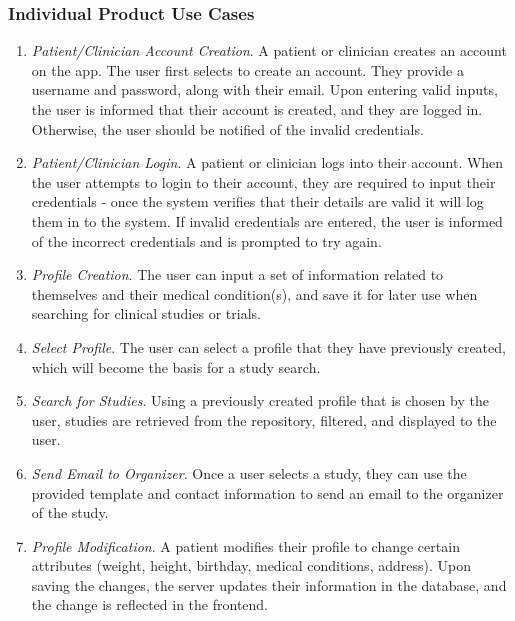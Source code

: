 \documentclass[12pt, titlepage]{article}
\begin{document}
\subsubsection{Individual Product Use Cases}

\begin{enumerate}

\item \textit{Patient/Clinician Account Creation}. A patient or clinician creates an account on the app. The user first selects to create an account. They provide a username and password, along with their email. Upon entering valid inputs, the user is informed that their account is created, and they are logged in. Otherwise, the user should be notified of the invalid credentials.

\item \textit{Patient/Clinician Login}. A patient or clinician logs into their account. When the user attempts to login to their account, they are required to input their credentials - once the system verifies that their details are valid it will log them in to the system. If invalid credentials are entered, the user is informed of the incorrect credentials and is prompted to try again.

\item \textit{Profile Creation}. The user can input a set of information related to themselves and their medical condition(s), and save it for later use when searching for clinical studies or trials.

\item \textit{Select Profile}. The user can select a profile that they have previously created, which will become the basis for a study search.

\item \textit{Search for Studies}. Using a previously created profile that is chosen by the user, studies are retrieved from the repository, filtered, and displayed to the user. 

\item \textit{Send Email to Organizer}. Once a user selects a study, they can use the provided template and contact information to send an email to the organizer of the study.

\item \textit{Profile Modification}. A patient modifies their profile to change certain attributes (weight, height, birthday, medical conditions, address). Upon saving the changes, the server updates their information in the database, and the change is reflected in the frontend.


\end{enumerate}
\end{document}
